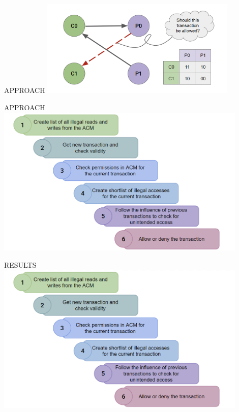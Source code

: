 \begin{frame}{APPROACH}
    \centering
    \includegraphics[height=0.7\textheight,width=0.7\textwidth,keepaspectratio]{graph_w_acm.png}
\end{frame}

\begin{frame}{APPROACH}
    \centering
    \includegraphics[height=0.85\textheight,width=0.9\textwidth,keepaspectratio]{steps.png}
\end{frame}

\begin{frame}{RESULTS}
    \centering
    \includegraphics[height=0.85\textheight,width=0.9\textwidth,keepaspectratio]{steps.png}
\end{frame}
